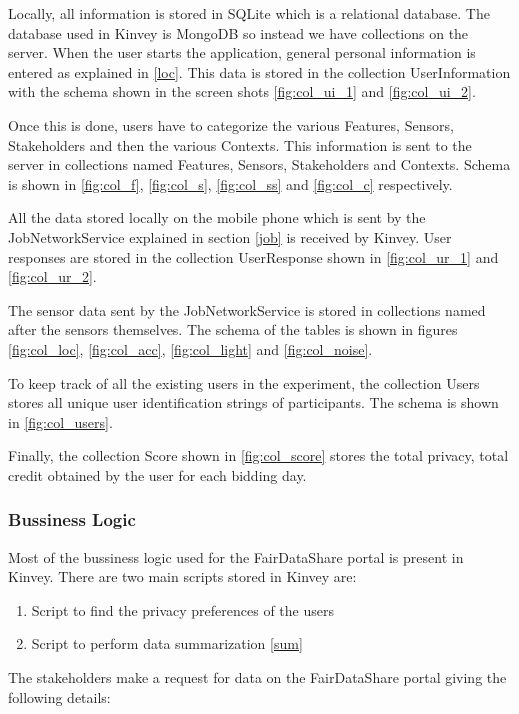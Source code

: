 Locally, all information is stored in SQLite which is a relational database. The database used in Kinvey is MongoDB so instead we have collections 
on the server.
When the user starts the application, general personal information is entered as explained in \ref{loc}. This data is stored in the
collection UserInformation with the schema shown in the screen shots \ref{fig:col_ui_1} and \ref{fig:col_ui_2}.

Once this is done, users have to categorize the various Features, Sensors, Stakeholders and then the various Contexts. This information is sent to the server in collections named Features, Sensors, Stakeholders and Contexts. Schema is shown in \ref{fig:col_f}, \ref{fig:col_s}, \ref{fig:col_ss} and \ref{fig:col_c} respectively.

All the data stored locally on the mobile phone which is sent by the JobNetworkService explained in section \ref{job} is received by Kinvey.
User responses are stored in the collection UserResponse shown in \ref{fig:col_ur_1} and \ref{fig:col_ur_2}.

The sensor data sent by the JobNetworkService is stored in collections named after the sensors themselves. The schema of the tables
is shown in figures \ref{fig:col_loc}, \ref{fig:col_acc}, \ref{fig:col_light} and \ref{fig:col_noise}.

To keep track of all the existing users in the experiment, the collection Users stores all unique user identification strings of participants.
The schema is shown in \ref{fig:col_users}.

Finally, the collection Score shown in \ref{fig:col_score} stores the total privacy, total credit obtained by the user for each bidding day.

\subsubsection{Bussiness Logic} \label{bl}
Most of the bussiness logic used for the FairDataShare portal is present in Kinvey. There are two main scripts stored in Kinvey are:

\begin{enumerate}
    \item Script to find the privacy preferences of the users
    \item Script to perform data summarization \ref{sum}
\end{enumerate}

The stakeholders make a request for data on the FairDataShare portal giving the following details:


